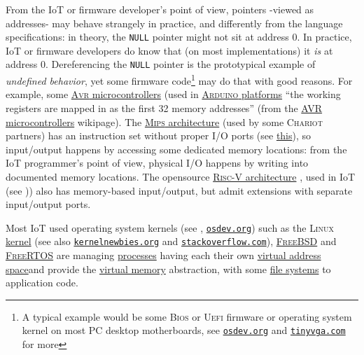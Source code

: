  From the IoT or firmware developer's point of view, pointers -viewed
 as addresses- may behave strangely in practice, and differently from
 the language specifications: in theory, the \texttt{NULL} pointer
 might not sit at address 0. In practice, IoT or firmware developers
 do know that (on most implementations) it \emph{is} at address
 0. Dereferencing the \texttt{NULL} pointer is the prototypical
 example of \emph{undefined behavior}, yet some firmware
 code\footnote{A typical example would be some \textsc{Bios} or
   \textsc{Uefi} firmware or operating system kernel on most PC
   desktop motherboards, see
   \href{https://osdev.org/}{\texttt{osdev.org}} and
   \href{http://tinyvga.com/}{\texttt{tinyvga.com}} for more} may do
 that with good reasons. For example, some
 \href{https://en.wikipedia.org/wiki/AVR_microcontrollers}{\textsc{Avr}
   microcontrollers}  (used in
 \href{https://arduino.cc/}{\textsc{Arduino} platforms} ``the working
 registers are mapped in as the first 32 memory addresses'' (from the
 \href{https://en.wikipedia.org/wiki/AVR_microcontrollers}{AVR
   microcontrollers} wikipage). The
 \href{https://en.wikipedia.org/wiki/MIPS_architecture}{\textsc{Mips}
   architecture} (used by some \textsc{Chariot} partners) has an
  instruction set without
 proper I/O ports (see
 \href{https://www2.cs.duke.edu/courses/fall13/compsci250/MIPS32\_QRC.pdf}{this}),
 so input/output happens by accessing some dedicated memory locations:
 from the IoT programmer's point of view, physical I/O happens by
 writing into documented memory locations. The opensource
 \href{https://riscv.org/}{\textsc{Risc-V} architecture}
 , used in IoT (see
 \cite{lee:2020:miot, waterman:2016:riscv-design})) also has
 memory-based input/output, but admit extensions with separate
 input/output ports.

 Most IoT used operating system kernels (see
 \cite{ArpaciDusseau14-Book},   
 \href{https://osdev.org}{\texttt{osdev.org}}) such as the
 \textsc{Linux} \href{http://kernel.org/}{kernel} (see also
 \href{https://kernelnewbies.org}{\texttt{kernelnewbies.org}} and
 \href{https://stackoverflow.com/}{\texttt{stackoverflow.com}}),
 \href{https://www.freebsd.org/}{\textsc{FreeBSD}} and
 \href{https://freertos.org/}{\textsc{FreeRTOS}} are managing
 \href{https://en.wikipedia.org/wiki/Process_(computing)}{processes}
 having each their own
 \href{https://en.wikipedia.org/wiki/Virtual_address_space}{virtual
   address space}and provide the
 \href{https://en.wikipedia.org/wiki/Virtual_memory}{virtual memory}
 abstraction, with some
 \href{https://en.wikipedia.org/wiki/File_system}{file systems} to
 application code.

